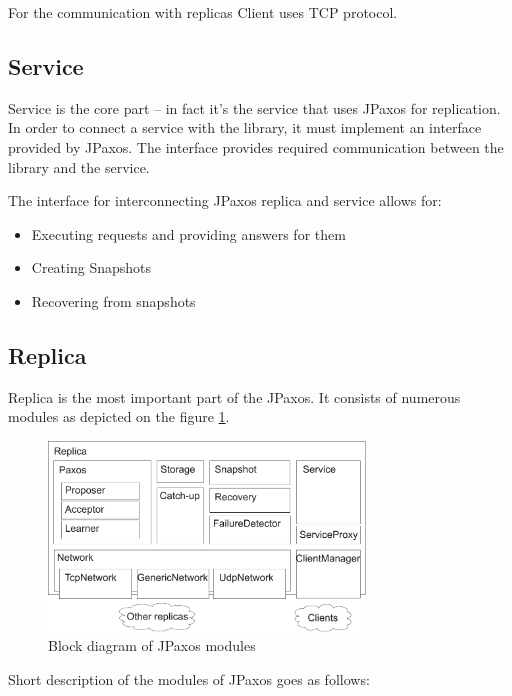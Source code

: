 For the communication with replicas Client uses TCP protocol.

\subsection{Service}

Service is the core part -- in fact it's the service that uses JPaxos for replication.
In order to connect a service with the library, it must implement an interface provided by JPaxos. The interface provides required communication between the library and the service.

The interface for interconnecting JPaxos replica and service allows for:
\begin{itemize}
 \item Executing requests and providing answers for them
 \item Creating Snapshots
 \item Recovering from snapshots
\end{itemize}

\subsection{Replica}

Replica is the most important part of the JPaxos. It consists of numerous modules as depicted on the figure \ref{fig:replica_architecture}.

\begin{figure}[h]
 \centering
 \includegraphics[keepaspectratio, width=0.75\textwidth]{architecture/replica_architecture.pdf}
 \caption{Block diagram of JPaxos modules}
 \label{fig:replica_architecture}
\end{figure}

Short description of the modules of JPaxos goes as follows:

